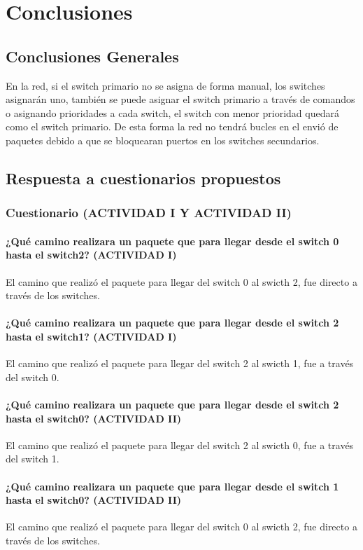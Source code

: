 \documentclass[spanish]{udpreport}
\begin{document}
\chapter{Conclusiones}
\section{Conclusiones Generales}


En la red, si el switch primario no se asigna de forma manual, los switches asignarán uno, también se puede asignar el switch primario a través de comandos o asignando prioridades a cada switch, el switch con menor prioridad quedará como el switch primario. De esta forma la red no tendrá bucles en el envió de paquetes debido a que se bloquearan puertos en los switches secundarios.
\\



\newpage
\section{Respuesta a cuestionarios propuestos}
\subsection{Cuestionario (ACTIVIDAD I Y ACTIVIDAD II)}
\subsubsection {¿Qué camino realizara un paquete que para llegar desde el switch
0 hasta el switch2? (ACTIVIDAD I)}
El camino que realizó el paquete para llegar del switch 0 al swicth 2, fue directo a través de los switches.
\subsubsection{¿Qué camino realizara un paquete que para llegar desde el switch
2 hasta el switch1? (ACTIVIDAD I)}
El camino que realizó el paquete para llegar del switch 2 al swicth 1, fue  a través del switch 0.

\subsubsection{ ¿Qué camino realizara un paquete que para llegar desde el switch
2 hasta el switch0? (ACTIVIDAD II)}
El camino que realizó el paquete para llegar del switch 2 al swicth 0, fue  a través del switch 1.
\subsubsection{ ¿Qué camino realizara un paquete que para llegar desde el switch 1 hasta el switch0? (ACTIVIDAD II)}
El camino que realizó el paquete para llegar del switch 0 al swicth 2, fue directo a través de los switches.
\newpage
\end{document}
